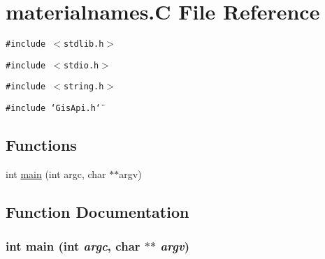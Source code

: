 \hypertarget{materialnames_8C}{
\section{materialnames.C File Reference}
\label{materialnames_8C}
}
{\tt \#include $<$stdlib.h$>$}\par
{\tt \#include $<$stdio.h$>$}\par
{\tt \#include $<$string.h$>$}\par
{\tt \#include \char`\"{}Gis\-Api.h\char`\"{}}\par
\subsection*{Functions}
\begin{CompactItemize}
\item 
int \hyperlink{materialnames_8C_a0}{main} (int argc, char $\ast$$\ast$argv)
\end{CompactItemize}


\subsection{Function Documentation}
\hypertarget{materialnames_8C_a0}{
\subsubsection[main]{\setlength{\rightskip}{0pt plus 5cm}int main (int {\em argc}, char $\ast$$\ast$ {\em argv})}}
\label{materialnames_8C_a0}


